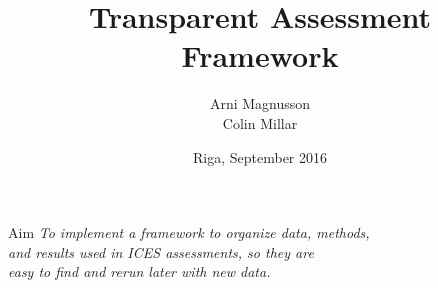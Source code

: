 \documentclass[aspectratio=169]{beamer}
\title{Transparent Assessment Framework}
\author{Arni Magnusson\\[0.5ex]Colin Millar}
\date{Riga, September 2016}
\begin{document}
\begin{frame}
  \titlepage
\end{frame}

\begin{frame}{Aim}\it
  To implement a framework to organize {\blue data}, {\blue methods},\\[1ex]
  and {\blue results} used in ICES assessments, so they are\\[1ex]
  easy to {\orange find} and {\orange rerun} later with new data.
\end{frame}
\end{document}
